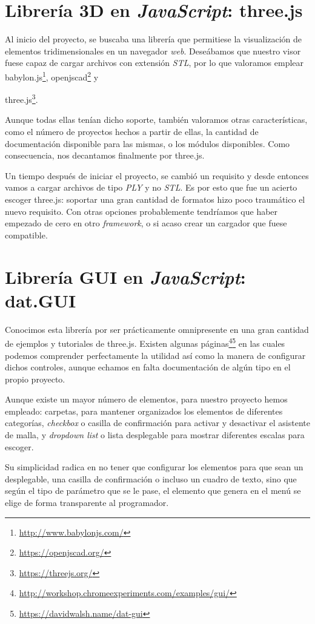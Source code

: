 \section{Librería 3D en \textit{JavaScript}: three.js}
Al inicio del proyecto, se buscaba una librería que permitiese la visualización de elementos tridimensionales en un navegador \textit{web}. Deseábamos que nuestro visor fuese capaz de cargar archivos con extensión \textit{STL}, por lo que valoramos emplear babylon.js\footnote{\url{http://www.babylonjs.com/}}, openjscad\footnote{\url{https://openjscad.org/}} y {three.js\footnote{\url{https://threejs.org/}}.

Aunque todas ellas tenían dicho soporte, también valoramos otras características, como el número de proyectos hechos a partir de ellas, la cantidad de documentación disponible para las mismas, o los módulos disponibles. Como consecuencia, nos decantamos finalmente por three.js.

Un tiempo después de iniciar el proyecto, se cambió un requisito y desde entonces vamos a cargar archivos de tipo \textit{PLY} y no \textit{STL}. Es por esto que fue un acierto escoger three.js: soportar una gran cantidad de formatos hizo poco traumático el nuevo requisito. Con otras opciones probablemente tendríamos que haber empezado de cero en otro \textit{framework}, o si acaso crear un cargador que fuese compatible.

\section{Librería GUI en \textit{JavaScript}: dat.GUI}
Conocimos esta librería por ser prácticamente omnipresente en una gran cantidad de ejemplos y tutoriales de three.js. Existen algunas páginas\footnote{\url{http://workshop.chromeexperiments.com/examples/gui/}}\footnote{\url{https://davidwalsh.name/dat-gui}} en las cuales podemos comprender perfectamente la utilidad así como la manera de configurar dichos controles, aunque echamos en falta documentación de algún tipo en el propio proyecto.

Aunque existe un mayor número de elementos, para nuestro proyecto hemos empleado: carpetas, para mantener organizados los elementos de diferentes categorías, \textit{checkbox} o casilla de confirmación para activar y desactivar el asistente de malla, y \textit{dropdown list} o lista desplegable para mostrar diferentes escalas para escoger.

Su simplicidad radica en no tener que configurar los elementos para que sean un desplegable, una casilla de confirmación o incluso un cuadro de texto, sino que según el tipo de parámetro que se le pase, el elemento que genera en el menú se elige de forma transparente al programador.

}
